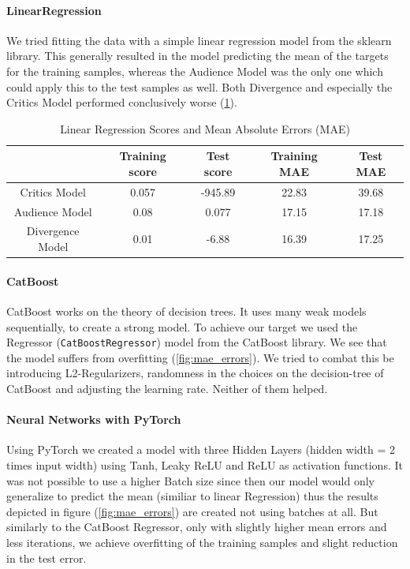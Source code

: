 \documentclass{article}
\begin{document}
    \paragraph{LinearRegression}
    We tried fitting the data with a simple linear regression model from the sklearn library. This generally resulted in the model predicting the mean of the targets for the training samples, whereas the Audience Model was the only one which could apply this to the test samples as well. Both Divergence and especially the Critics Model performed conclusively worse (\ref{tab:lin_regression}).
    \begin{table}[h]
        \centering
        \begin{tabular}{c||c|c|c|c}
             & Training score & Test score & Training MAE & Test MAE \\
            \hline
            Critics Model       & 0.057 & -945.89   & 22.83     & 39.68 \\
            \hline
            Audience Model      & 0.08  & 0.077     & 17.15     & 17.18 \\
            \hline
            Divergence Model    & 0.01  & -6.88     & 16.39     & 17.25
        \end{tabular}
        \caption{Linear Regression Scores and Mean Absolute Errors (MAE)}
        \label{tab:lin_regression}
    \end{table}

    \paragraph{CatBoost}
    CatBoost works on the theory of decision trees. It uses many weak models sequentially, to create a strong model. To achieve our target we used the Regressor (\texttt{CatBoostRegressor}) model from the CatBoost library.
    We see that the model suffers from overfitting (\ref{fig:mae_errors}). We tried to combat this be introducing L2-Regularizers, randomness in the choices on the decision-tree of CatBoost and adjusting the learning rate. Neither of them helped. 
    
    \paragraph{Neural Networks with PyTorch}
    Using PyTorch we created a model with three Hidden Layers (hidden width = 2 times input width) using Tanh, Leaky ReLU and ReLU as activation functions. It was not possible to use a higher Batch size since then our model would only generalize to predict the mean (similiar to linear Regression) thus the results depicted in figure (\ref{fig:mae_errors}) are created not using batches at all. But similarly to the CatBoost Regressor, only with slightly higher mean errors and less iterations, we achieve overfitting of the training samples and slight reduction in the test error. 
    
\end{document}
